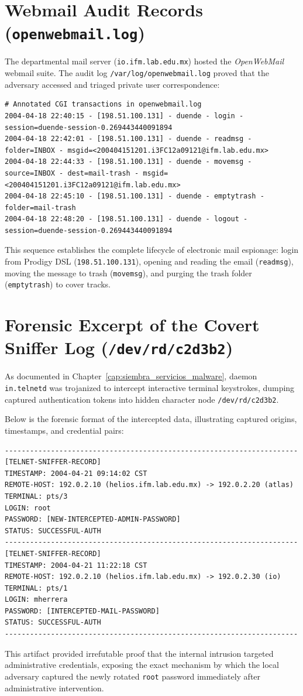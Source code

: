 \section{Webmail Audit Records (\texttt{openwebmail.log})}

The departmental mail server (\texttt{io.ifm.lab.edu.mx}) hosted the \textit{OpenWebMail} webmail suite. The audit log \texttt{/var/log/openwebmail.log} proved that the adversary accessed and triaged private user correspondence:

\begin{lstlisting}[style=terminal]
# Annotated CGI transactions in openwebmail.log
2004-04-18 22:40:15 - [198.51.100.131] - duende - login - session=duende-session-0.269443440091894
2004-04-18 22:42:01 - [198.51.100.131] - duende - readmsg - folder=INBOX - msgid=<200404151201.i3FC12a09121@ifm.lab.edu.mx>
2004-04-18 22:44:33 - [198.51.100.131] - duende - movemsg - source=INBOX - dest=mail-trash - msgid=<200404151201.i3FC12a09121@ifm.lab.edu.mx>
2004-04-18 22:45:10 - [198.51.100.131] - duende - emptytrash - folder=mail-trash
2004-04-18 22:48:20 - [198.51.100.131] - duende - logout - session=duende-session-0.269443440091894
\end{lstlisting}

This sequence establishes the complete lifecycle of electronic mail espionage: login from Prodigy DSL (\texttt{198.51.100.131}), opening and reading the email (\texttt{readmsg}), moving the message to trash (\texttt{movemsg}), and purging the trash folder (\texttt{emptytrash}) to cover tracks.

\section{Forensic Excerpt of the Covert Sniffer Log (\texttt{/dev/rd/c2d3b2})}

As documented in Chapter~\ref{cap:siembra_servicios_malware}, daemon \texttt{in.telnetd} was trojanized to intercept interactive terminal keystrokes, dumping captured authentication tokens into hidden character node \texttt{/dev/rd/c2d3b2}.

Below is the forensic format of the intercepted data, illustrating captured origins, timestamps, and credential pairs:

\begin{lstlisting}[style=terminal]
----------------------------------------------------------------------
[TELNET-SNIFFER-RECORD]
TIMESTAMP: 2004-04-21 09:14:02 CST
REMOTE-HOST: 192.0.2.10 (helios.ifm.lab.edu.mx) -> 192.0.2.20 (atlas)
TERMINAL: pts/3
LOGIN: root
PASSWORD: [NEW-INTERCEPTED-ADMIN-PASSWORD]
STATUS: SUCCESSFUL-AUTH
----------------------------------------------------------------------
[TELNET-SNIFFER-RECORD]
TIMESTAMP: 2004-04-21 11:22:18 CST
REMOTE-HOST: 192.0.2.10 (helios.ifm.lab.edu.mx) -> 192.0.2.30 (io)
TERMINAL: pts/1
LOGIN: mherrera
PASSWORD: [INTERCEPTED-MAIL-PASSWORD]
STATUS: SUCCESSFUL-AUTH
----------------------------------------------------------------------
\end{lstlisting}

This artifact provided irrefutable proof that the internal intrusion targeted administrative credentials, exposing the exact mechanism by which the local adversary captured the newly rotated \texttt{root} password immediately after administrative intervention.

